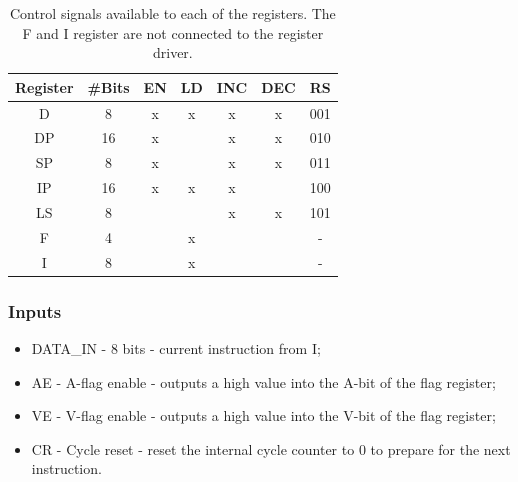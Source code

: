 \begin{table}[H]
  \centering
  \begin{tabular}{c|c|c|c|c|c|c}
    Register & \#Bits & EN  & LD  & INC  & DEC & RS \\ \hline 
    D        & 8     & x & x & x & x & 001 \\
    DP       & 16    & x &   & x & x & 010 \\ 
    SP       & 8     & x &   & x & x & 011 \\ 
    IP       & 16    & x & x & x &   & 100 \\ 
    LS       & 8     &   &   & x & x & 101 \\ 
    F        & 4     &   & x &   &   & -   \\ 
    I        & 8     &   & x &   &   & -   \\
  \end{tabular}
  \caption{Control signals available to each of the registers. The F and I register are not connected to the register driver.}
  \label{tab:registers}
\end{table}


\subsubsection*{Inputs}
\begin{itemize}
\item DATA\_IN - 8 bits - current instruction from I;
\item AE - A-flag enable - outputs a high value into the A-bit of the flag register;
\item VE - V-flag enable - outputs a high value into the V-bit of the flag register;
\item CR - Cycle reset - reset the internal cycle counter to 0 to prepare for the next instruction.
\end{itemize}

